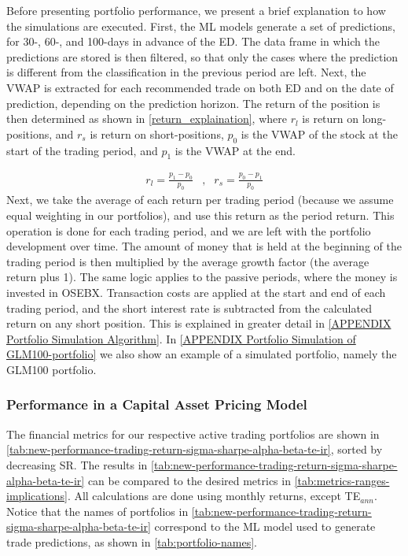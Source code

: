 Before presenting portfolio performance, we present a brief explanation to how the simulations are executed. First, the ML models generate a set of predictions, for 30-, 60-, and 100-days in advance of the ED. The data frame in which the predictions are stored is then filtered, so that only the cases where the prediction is different from the classification in the previous period are left. Next, the VWAP is extracted for each recommended trade on both ED and on the date of prediction, depending on the prediction horizon. The return of the position is then determined as shown in \autoref{return_explaination}, where $r_l$ is return on long-positions, and $r_s$ is return on short-positions, $p_0$ is the VWAP of the stock at the start of the trading period, and $p_1$ is the VWAP at the end. 

\begin{equation}
\begin{aligned}
    r_l = \frac{p_1 - p_0 }{p_0} &  ,  &r_s = \frac{p_0 - p_1 }{p_0} 
    
\label{return_explaination}
\end{aligned}
\end{equation}
Next, we take the average of each return per trading period (because we assume equal weighting in our portfolios), and use this return as the period return. This operation is done for each trading period, and we are left with the portfolio development over time. The amount of money that is held at the beginning of the trading period is then multiplied by the average growth factor (the average return plus 1). The same logic applies to the passive periods, where the money is invested in OSEBX. Transaction costs are applied at the start and end of each trading period, and the short interest rate is subtracted from the calculated return on any short position. This is explained in greater detail in \autoref{APPENDIX Portfolio Simulation Algorithm}. In \autoref{APPENDIX Portfolio Simulation of GLM100-portfolio} we also show an example of a simulated portfolio, namely the GLM100 portfolio.

\subsubsection{Performance in a Capital Asset Pricing Model}

 The financial metrics for our respective active trading portfolios are shown in \autoref{tab:new-performance-trading-return-sigma-sharpe-alpha-beta-te-ir}, sorted by decreasing SR. The results in \autoref{tab:new-performance-trading-return-sigma-sharpe-alpha-beta-te-ir} can be compared to the desired metrics in \autoref{tab:metrics-ranges-implications}. All calculations are done using monthly returns, except TE$_{ann}$. Notice that the names of portfolios in \autoref{tab:new-performance-trading-return-sigma-sharpe-alpha-beta-te-ir} correspond to the ML model used to generate trade predictions, as shown in \autoref{tab:portfolio-names}. 


